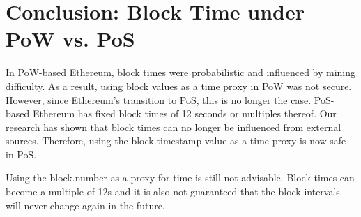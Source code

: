 \section{Conclusion: Block Time under PoW vs. PoS}
In PoW-based Ethereum, block times were probabilistic and influenced by mining difficulty.
As a result, using block values as a time proxy in PoW was not secure.
However, since Ethereum's transition to PoS, this is no longer the case.
PoS-based Ethereum has fixed block times of 12 seconds or multiples thereof.
Our research has shown that block times can no longer be influenced from external sources.
Therefore, using the block.timestamp value as a time proxy is now safe in PoS.

Using the block.number as a proxy for time is still not advisable. Block times 
can become a multiple of 12s and it is also not guaranteed that the block intervals will
never change again in the future.
